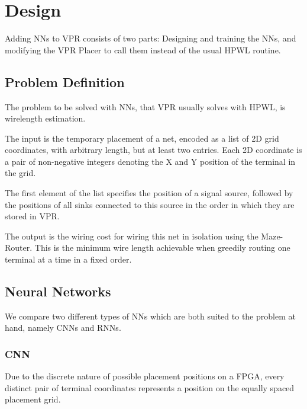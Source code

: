 
\chapter{Design}\label{ch:design}
\glsresetall %

Adding \glspl{NN} to \gls{VPR} consists of two parts: Designing and training the \glspl{NN}, and modifying the \gls{VPR} Placer to call them instead of the usual \gls{HPWL} routine.

\section{Problem Definition}

The problem to be solved with \glspl{NN}, that \gls{VPR} usually solves with \gls{HPWL}, is wirelength estimation.

The input is the temporary placement of a net, encoded as a list of 2D grid coordinates, with arbitrary length, but at least two entries. Each 2D coordinate is a pair of non-negative integers denoting the X and Y position of the terminal in the grid. 

The first element of the list specifies the position of a signal source, followed by the positions of all sinks connected to this source in the order in which they are stored in \gls{VPR}.

The output is the wiring cost for wiring this net in isolation using the Maze-Router. This is the minimum wire length achievable when greedily routing one terminal at a time in a fixed order.

\section{Neural Networks}

We compare two different types of \glspl{NN} which are both suited to the problem at hand, namely \glspl{CNN} and \glspl{RNN}.

\subsection{\gls{CNN}}

Due to the discrete nature of possible placement positions on a \gls{FPGA}, every distinct pair of terminal coordinates represents a position on the equally spaced placement grid. 

